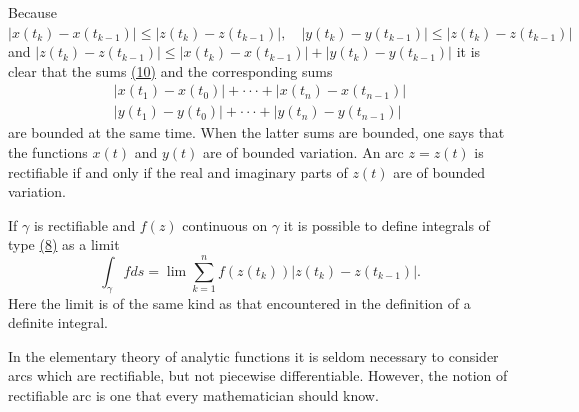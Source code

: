 Because $|x(t_k) - x(t_{k-1})| \leq |z(t_k) - z(t_{k-1})|, \quad |y(t_k) - y(t_{k-1})| \leq |z(t_k) - z(t_{k-1})|$ and $|z(t_k) - z(t_{k-1})| \leq |x(t_k) - x(t_{k-1})| + |y(t_k) - y(t_{k-1})|$ it is clear that the sums \hyperref[eq:4.10]{(10)} and the corresponding sums
\begin{equation*}
\begin{array}{l} | x (t _ {1}) - x (t _ {0}) | + \cdot \cdot \cdot + | x (t _ {n}) - x (t _ {n - 1}) | \\ | y (t _ {1}) - y (t _ {0}) | + \cdot \cdot \cdot + | y (t _ {n}) - y (t _ {n - 1}) | \end{array}
\end{equation*}
are bounded at the same time. When the latter sums are bounded, one says that the functions $x(t)$ and $y(t)$ are of bounded variation. An arc $z = z(t)$ is rectifiable if and only if the real and imaginary parts of $z(t)$ are of bounded variation.

If $\gamma$ is rectifiable and $f(z)$ continuous on $\gamma$ it is possible to define integrals of type \hyperref[eq:4.8]{(8)} as a limit
\begin{equation*}
\int_ {\gamma} f d s = \lim \sum_ {k = 1} ^ {n} f (z (t _ {k})) | z (t _ {k}) - z (t _ {k - 1}) |.
\end{equation*}
Here the limit is of the same kind as that encountered in the definition of a definite integral.

In the elementary theory of analytic functions it is seldom necessary to consider arcs which are rectifiable, but not piecewise differentiable. However, the notion of rectifiable arc is one that every mathematician should know.

